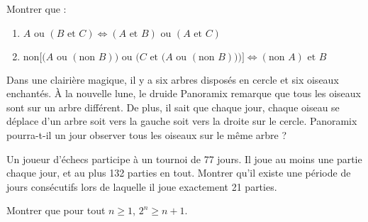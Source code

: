 \begin{exo}
Montrer que :
\begin{enumerate}
\item $A \text{ ou } (B \text{ et } C) \iff (A \text{ et } B) \text{ ou } (A \text{ et } C)$
\item $\text{non} \Bigg [ \bigg ( A \text{\ ou\ } (\text{non\ } B) \bigg ) \text{\ ou\ } \bigg ( C \text{\ et\ } \Big ( A \text{\ ou\ } (\text{non\ } B)
\Big ) \bigg ) \Bigg ]
\iff (\text{non\ } A) \text{\ et\ } B$
\end{enumerate}
\end{exo}



\begin{exo}
Dans une clairière magique, il y a six arbres disposés en cercle et six oiseaux enchantés. À la nouvelle lune, le druide Panoramix remarque que tous les oiseaux sont sur un arbre différent. De plus, il sait que chaque jour, chaque oiseau se déplace d'un arbre soit vers la gauche soit vers la droite sur le cercle. Panoramix pourra-t-il un jour observer tous les oiseaux sur le même arbre ?
\end{exo}

\begin{exo}
Un joueur d'échecs participe à un tournoi de 77 jours. Il joue au moins une partie chaque jour, et au plus 132 parties en tout. Montrer qu'il existe une période de jours consécutifs lors de laquelle il joue exactement 21 parties.
\end{exo}

\begin{exo}
Montrer que pour tout $n \geq 1$, 
$2^n\ge n+1.$
\end{exo}
